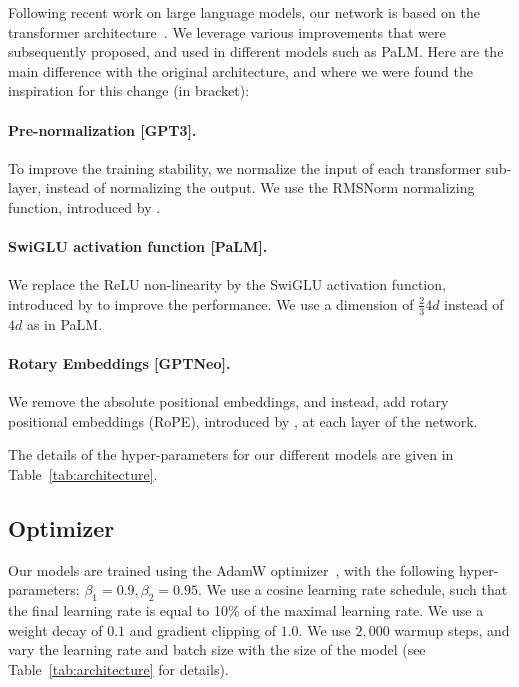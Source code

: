 Following recent work on large language models, our network is based on the transformer architecture~\cite{vaswaniAttention2017}. We leverage various improvements that were subsequently proposed, and used in different models such as PaLM. Here are the main difference with the original architecture, and where we were found the inspiration for this change (in bracket):

\paragraph{Pre-normalization [GPT3].} To improve the training stability, we normalize the input of each transformer sub-layer, instead of normalizing the output. We use the RMSNorm normalizing function, introduced by \citet{zhang2019root}.

\paragraph{SwiGLU activation function [PaLM].} We replace the ReLU non-linearity by the SwiGLU activation function, introduced by \citet{shazeer2020glu} to improve the performance. We use a dimension of $\frac23 4d$ instead of $4d$ as in PaLM.

\paragraph{Rotary Embeddings [GPTNeo].}We remove the absolute positional embeddings, and instead, add rotary positional embeddings (RoPE), introduced by \citet{su2021roformer}, at each layer of the network.

The details of the hyper-parameters for our different models are given in Table~\ref{tab:architecture}.

\subsection{Optimizer}

Our models are trained using the AdamW optimizer~\citep{loshchilov2017decoupled}, with the following hyper-parameters: $\beta_1 = 0.9, \beta_2 = 0.95$. We use a cosine learning rate schedule, such that the final learning rate is equal to 10\% of the maximal learning rate. We use a weight decay of $0.1$ and gradient clipping of $1.0$. We use $2,000$ warmup steps, and vary the learning rate and batch size with the size of the model (see Table~\ref{tab:architecture} for details).

